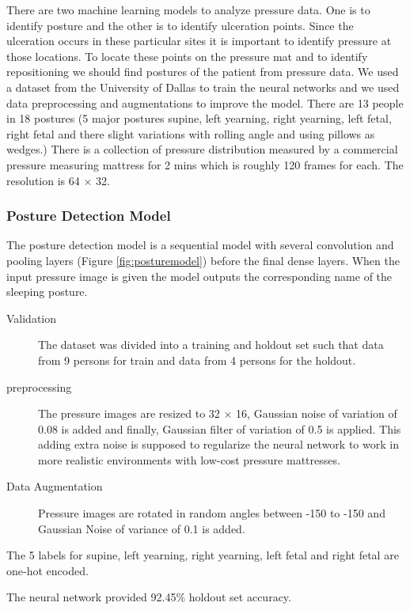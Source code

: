 There are two machine learning models to analyze pressure data. One is to identify posture and the other is to identify ulceration points. Since the ulceration occurs in these particular sites it is important to identify pressure at those locations. To locate these points on the pressure mat and to identify repositioning we should find postures of the patient from pressure data. 
We used a dataset from the University of Dallas to train the neural networks and we used data preprocessing and augmentations to improve the model. There are 13 people in 18 postures (5 major postures supine, left yearning, right yearning, left fetal, right fetal and there slight variations with rolling angle and using pillows as wedges.) There is a collection of pressure distribution measured by a commercial pressure measuring mattress for 2 mins which is roughly 120 frames for each. The resolution is 64 $\times$ 32.

\subsubsection{Posture Detection Model}

The posture detection model is a sequential model with several convolution and pooling layers (Figure \ref{fig:posturemodel}) before the final dense layers. When the input pressure image is given the model outputs the corresponding name of the sleeping posture. 


\begin{description}
	\item[Validation] The dataset was divided into a training and holdout set such that data from 9 persons for train and data from 4 persons for the holdout.
	\item[preprocessing] The pressure images are resized to 32 $\times$ 16, Gaussian noise of variation of 0.08 is added and finally, Gaussian filter of variation of 0.5 is applied. This adding extra noise is supposed to regularize the neural network to work in more realistic environments with low-cost pressure mattresses.
	\item[Data Augmentation]  Pressure images are rotated in random angles between -150 to -150 and Gaussian Noise of variance of 0.1 is added.	
\end{description}

The 5 labels for supine, left yearning, right yearning, left fetal and right fetal are one-hot encoded. 

The neural network provided 92.45\% holdout set accuracy.


